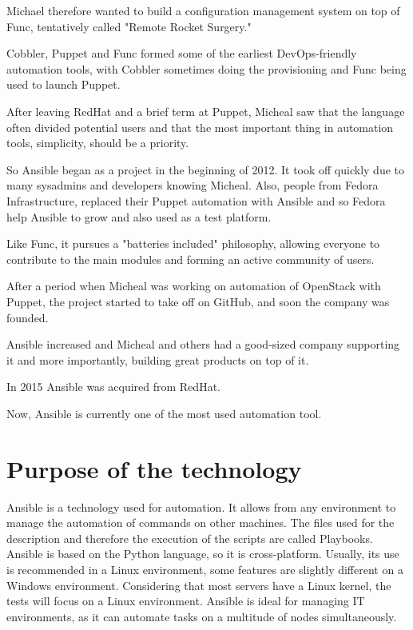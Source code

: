 \documentclass[12pt,a4paper,openright,twoside]{book}
\begin{document}
Michael therefore wanted to build a configuration management system on top of Func, tentatively called "Remote Rocket Surgery."

Cobbler, Puppet and Func formed some of the earliest DevOps-friendly automation tools, with Cobbler sometimes doing the provisioning and Func being used to launch Puppet.

After leaving RedHat and a brief term at Puppet, Micheal saw that the language often divided potential users and that the most important thing in automation tools, simplicity, should be a priority.

So Ansible began as a project in the beginning of 2012. It took off quickly due to many sysadmins and developers knowing Micheal.
Also, people from Fedora Infrastructure, replaced their Puppet automation with Ansible and so Fedora help Ansible to grow and also used as a test platform.

Like Func, it pursues a "batteries included" philosophy, allowing everyone to contribute to the main modules and forming an active community of users.

After a period when Micheal was working on automation of OpenStack with Puppet, the project started to take off on GitHub, and soon the company was founded.

Ansible increased and Micheal and others had a good-sized company supporting it and more importantly, building great products on top of it.

In 2015 Ansible was acquired from RedHat\cite{ansibleRedHat}.

Now, Ansible is currently one of the most used automation tool.

\section{Purpose of the technology}
Ansible is a technology used for automation. It allows from any environment to manage the automation of commands on other machines.
The files used for the description and therefore the execution of the scripts are called Playbooks.
Ansible is based on the Python language, so it is cross-platform.
Usually, its use is recommended in a Linux environment, some features are slightly different on a Windows environment.
Considering that most servers have a Linux kernel, the tests will focus on a Linux environment.
Ansible is ideal for managing IT environments, as it can automate tasks on a multitude of nodes simultaneously.
\end{document}
